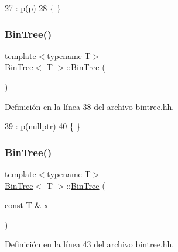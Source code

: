 \begin{DoxyCode}
27     :   \hyperlink{class_bin_tree_afe3647af1dda90f6ddf1deee6560fcf1}{p}(\hyperlink{class_bin_tree_afe3647af1dda90f6ddf1deee6560fcf1}{p})
28     \{   \}
\end{DoxyCode}
\mbox{\label{class_bin_tree_a47eef22d29cd023449d97c073c08e5b6}} 
\subsubsection{\texorpdfstring{Bin\+Tree()}{BinTree()}\hspace{0.1cm}{\footnotesize\ttfamily [2/4]}}
{\footnotesize\ttfamily template$<$typename T$>$ \\
\hyperlink{class_bin_tree}{Bin\+Tree}$<$ T $>$\+::\hyperlink{class_bin_tree}{Bin\+Tree} (\begin{DoxyParamCaption}{ }\end{DoxyParamCaption})}



Definición en la línea 38 del archivo bintree.\+hh.


\begin{DoxyCode}
39     :   \hyperlink{class_bin_tree_afe3647af1dda90f6ddf1deee6560fcf1}{p}(\textcolor{keyword}{nullptr})
40     \{   \}
\end{DoxyCode}
\mbox{\label{class_bin_tree_a1ab686e0bcf990093ff91fe71744c1a4}} 
\subsubsection{\texorpdfstring{Bin\+Tree()}{BinTree()}\hspace{0.1cm}{\footnotesize\ttfamily [3/4]}}
{\footnotesize\ttfamily template$<$typename T$>$ \\
\hyperlink{class_bin_tree}{Bin\+Tree}$<$ T $>$\+::\hyperlink{class_bin_tree}{Bin\+Tree} (\begin{DoxyParamCaption}\item[{const T \&}]{x }\end{DoxyParamCaption})}



Definición en la línea 43 del archivo bintree.\+hh.



